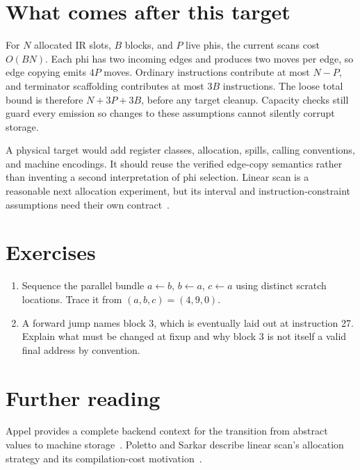 \section{What comes after this target}
\label{sec:pebble-target-cost}
For $N$ allocated IR slots, $B$ blocks, and $P$ live phis, the current scans cost $O(BN)$.
Each phi has two incoming edges and produces two moves per edge, so edge copying emits $4P$ moves.
Ordinary instructions contribute at most $N-P$, and terminator scaffolding contributes at most $3B$ instructions.
The loose total bound is therefore $N+3P+3B$, before any target cleanup.
Capacity checks still guard every emission so changes to these assumptions cannot silently corrupt storage.

A physical target would add register classes, allocation, spills, calling conventions, and machine encodings.
It should reuse the verified edge-copy semantics rather than inventing a second interpretation of phi selection.
Linear scan is a reasonable next allocation experiment, but its interval and instruction-constraint assumptions need their own contract~\cite{poletto-1999-linear-scan}.

\section{Exercises}
\label{sec:pebble-fifteen-exercises}
\begin{enumerate}
\item \label{ex:pebble-copy-bundle} Sequence the parallel bundle $a\gets b$, $b\gets a$, $c\gets a$ using distinct scratch locations. Trace it from $(a,b,c)=(4,9,0)$.
\item \label{ex:pebble-fixup} A forward jump names block 3, which is eventually laid out at instruction 27. Explain what must be changed at fixup and why block 3 is not itself a valid final address by convention.
\end{enumerate}

\section{Further reading}
\label{sec:pebble-fifteen-reading}
Appel provides a complete backend context for the transition from abstract values to machine storage~\cite{appel-1998-modern}.
Poletto and Sarkar describe linear scan's allocation strategy and its compilation-cost motivation~\cite{poletto-1999-linear-scan}.
